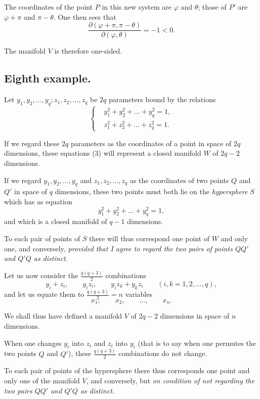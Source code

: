 \documentclass{article}
\begin{document}
The coordinates of the point $P$ in this new system are $\varphi$ and $\theta$; those of $P'$ are $\varphi + \pi$ and $\pi - \theta$. One then sees that
\[ \frac{\partial(\varphi + \pi, \pi - \theta)}{\partial(\varphi, \theta)} = -1 < 0. \]

The manifold $V$ is therefore one-sided.

\subsection*{Eighth example.}

Let $y_{1}, y_{2}, \ldots, y_{q}; z_{1}, z_{2}, \ldots, z_{q}$ be $2q$ parameters bound by the relations
\[ \left\{ \begin{aligned} &y^{2}_{1} + y^{2}_{2} + \ldots + y^{2}_{q} = 1,\\ &z^{2}_{1} + z^{2}_{2} + \ldots + z^{2}_{q} = 1. \end{aligned} \right. \tag{3} \]

If we regard these $2q$ parameters as the coordinates of a point in space of $2q$ dimensions, these equations (3) will represent a closed manifold $W$ of $2q - 2$ dimensions.

If we regard $y_{1}, y_{2}, \ldots, y_{q}$ and $z_{1}, z_{2}, \ldots, z_{q}$ as the coordinates of two points $Q$ and $Q'$ in space of $q$ dimensions, these two points must both lie on the \emph{hypersphere} $S$ which has as equation
\[ y^{2}_{1} + y^{2}_{2} + \ldots + y^{2}_{q} = 1, \]
and which is a closed manifold of $q - 1$ dimensions.

To each pair of points of $S$ there will thus correspond one point of $W$ and only one, and conversely, \emph{provided that I agree to regard the two pairs of points $QQ'$ and $Q'Q$ as distinct}.

Let us now consider the $\frac{q(q + 3)}{2}$ combinations
\[ y_{i} + z_{i}, \qquad y_{i}z_{i}, \qquad y_{i}z_{k} + y_{k}z_{i} \qquad (i, k = 1, 2, \ldots, q), \]
and let us equate them to $\frac{q(q + 3)}{2} = n$ variables
\[ x_{1}, \qquad x_{2}, \qquad \ldots, \qquad x_{n}. \]

We shall thus have defined a manifold $V$ of $2q - 2$ dimensions in space of $n$ dimensions.

When one changes $y_{i}$ into $z_{i}$ and $z_{i}$ into $y_{i}$ (that is to say when one permutes the two points $Q$ and $Q'$), these $\frac{q(q + 3)}{2}$ combinations do not change.

To each pair of points of the hypersphere there thus corresponds one point and only one of the manifold $V$, and conversely, but \emph{on condition of not regarding the two pairs $QQ'$ and $Q'Q$ as distinct}.
\end{document}
